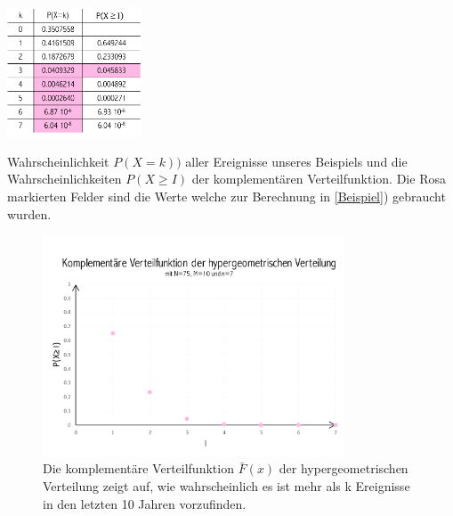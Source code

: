 \begin{refsection}
\begin{table}
\centering
\includegraphics[width=0.3\textwidth]{extrem/TabExt.pdf}
\caption{Wahrscheinlichkeit $P(X = k))$ aller Ereignisse unseres Beispiels und die Wahrscheinlichkeiten $P(X \ge I)$ der komplementären Verteilfunktion. Die Rosa markierten Felder sind die Werte welche zur Berechnung in \ref{Beispiel}) gebraucht wurden. }
\label{TabExt}
\end{table}

\begin{figure}
\centering
\includegraphics[width=0.8\textwidth]{extrem/HyperExt.pdf}
\caption{Die komplementäre Verteilfunktion $\bar{F}(x)$ der hypergeometrischen Verteilung zeigt auf, wie wahrscheinlich es ist mehr als k Ereignisse in den letzten 10 Jahren vorzufinden.}
\label{HyperExt}
\end{figure}




\end{refsection}
